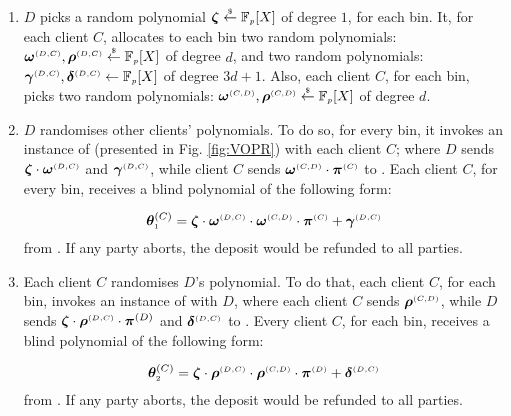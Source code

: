 \begin{enumerate}
\item  $D$ picks a  random polynomial $\bm\zeta \stackrel{\scriptscriptstyle\$}\leftarrow \mathbb{F}_{\scriptscriptstyle p}[X]$ of degree $1$, for each bin.  
It, for each client $C$, allocates to each bin two random polynomials: $\bm\omega^{\scriptscriptstyle(D,C)}, \bm\rho^{\scriptscriptstyle (D,C)}\stackrel{\scriptscriptstyle\$}\leftarrow \mathbb{F}_{\scriptscriptstyle p}[X]$ of degree $d$, and  two  random polynomials: $\bm\gamma^{\scriptscriptstyle (D,C)}, \bm\delta^{\scriptscriptstyle (D,C)} \leftarrow \mathbb{F}_{\scriptscriptstyle p}[X]$ of degree $3d+1$. Also, each client $C$, for each bin, picks two  random polynomials: $\bm\omega^{\scriptscriptstyle (C,D)}, \bm\rho^{\scriptscriptstyle (C,D)}\stackrel{\scriptscriptstyle\$}\leftarrow \mathbb{F}_{\scriptscriptstyle p}[X]$ of degree $d$. %




\item\label{e-psi::D-randomises}  $D$ randomises other clients' polynomials. To do so, for every bin, it invokes an instance of {\vopr} (presented in Fig. \ref{fig:VOPR}) with  each client $  C$; where  $D$ sends $\bm\zeta \cdot \bm\omega^{\scriptscriptstyle  {  {(D,C)}}}$ and $\bm\gamma^{\scriptscriptstyle  {  {(D,C)}}}$, while client $ C$ sends $\bm\omega^{\scriptscriptstyle  {  {(C,D)}}}\cdot \bm\pi^{\scriptscriptstyle  {  {(C)}}}$ to {\vopr}. Each client $    {  C}$, for every bin, receives a blind polynomial of the following form: 

$$\bm\theta^{  {  {(C)}}}_{\scriptscriptstyle 1}=\bm\zeta \cdot \bm\omega^{\scriptscriptstyle  {  {(D,C)}}}\cdot \bm\omega^{\scriptscriptstyle  {  {(C,D)}}}\cdot \bm\pi^{\scriptscriptstyle  {  {(C)}}}+\bm\gamma^{\scriptscriptstyle  {  {(D,C)}}}$$
%
 from {\vopr}. If any party aborts, the deposit would be refunded to all parties.

\item\label{e-psi::C-randomises} Each client $    {  C}$ randomises  $ {D}$'s polynomial. To do that, each client $    {  C}$, for each bin,  invokes an instance of {\vopr} with   $ {D}$,    where each client $    {  C}$  sends $\bm\rho^{\scriptscriptstyle  {  {(C,D)}}}$, while  ${D}$  sends $\bm\zeta\cdot\bm \rho^{\scriptscriptstyle  {  {(D,C)}}}\cdot \bm\pi^{  {  {(D)}}}$ and $\bm\delta^{\scriptscriptstyle  {  {(D,C)}}}$ to {\vopr}. Every client   $    {  C}$, for each bin,  receives a blind polynomial of the following form: 

$$\bm\theta^{  {  {(C)}}}_{\scriptscriptstyle 2}=\bm\zeta \cdot \bm\rho^{\scriptscriptstyle  {  {(D,C)}}}\cdot \bm\rho^{\scriptscriptstyle  {  {(C,D)}}}\cdot \bm\pi^{\scriptscriptstyle  {  {(D)}}}+\bm\delta^{\scriptscriptstyle  {  {(D,C)}}}$$
 from {\vopr}. If any party aborts, the deposit would be refunded to all parties.



\end{enumerate}
